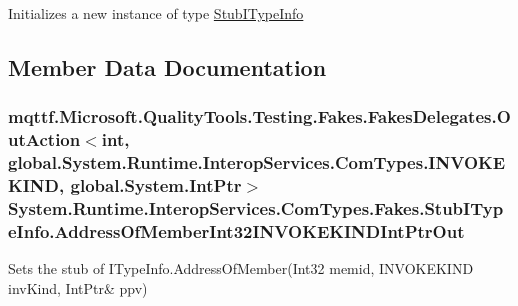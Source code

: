 Initializes a new instance of type \hyperlink{class_system_1_1_runtime_1_1_interop_services_1_1_com_types_1_1_fakes_1_1_stub_i_type_info}{Stub\-I\-Type\-Info}



\subsection{Member Data Documentation}
\hypertarget{class_system_1_1_runtime_1_1_interop_services_1_1_com_types_1_1_fakes_1_1_stub_i_type_info_a11bfa39a0103d0bb64696328033c5406}{
\subsubsection[{Address\-Of\-Member\-Int32\-I\-N\-V\-O\-K\-E\-K\-I\-N\-D\-Int\-Ptr\-Out}]{\setlength{\rightskip}{0pt plus 5cm}mqttf.\-Microsoft.\-Quality\-Tools.\-Testing.\-Fakes.\-Fakes\-Delegates.\-Out\-Action$<$int, global.\-System.\-Runtime.\-Interop\-Services.\-Com\-Types.\-I\-N\-V\-O\-K\-E\-K\-I\-N\-D, global.\-System.\-Int\-Ptr$>$ System.\-Runtime.\-Interop\-Services.\-Com\-Types.\-Fakes.\-Stub\-I\-Type\-Info.\-Address\-Of\-Member\-Int32\-I\-N\-V\-O\-K\-E\-K\-I\-N\-D\-Int\-Ptr\-Out}}\label{class_system_1_1_runtime_1_1_interop_services_1_1_com_types_1_1_fakes_1_1_stub_i_type_info_a11bfa39a0103d0bb64696328033c5406}


Sets the stub of I\-Type\-Info.\-Address\-Of\-Member(Int32 memid, I\-N\-V\-O\-K\-E\-K\-I\-N\-D inv\-Kind, Int\-Ptr\& ppv)

